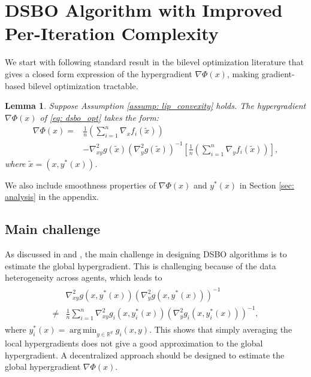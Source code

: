 \documentclass{article}
\theoremstyle{plain}
\newtheorem{lemma}[theorem]{Lemma}
\theoremstyle{definition}
\theoremstyle{remark}
\DeclareMathOperator*{\argmin}{arg\,min}
\newcommand{\R}{\mathbb{R}}
\begin{document}
\section{DSBO Algorithm with Improved Per-Iteration Complexity}\label{sec: algorithms}
We start with following standard result in the bilevel optimization literature \citep{ghadimi2018approximation, hong2020two,ji2020convergence,chen2021closing} that gives a closed form expression of the hypergradient $\nabla\Phi(x)$, making gradient-based bilevel optimization tractable.%
\begin{lemma}
    Suppose Assumption \ref{assump: lip_convexity} holds. The hypergradient $\nabla\Phi(x)$ of \eqref{eq: dsbo_opt} takes the form:
    \begin{equation}\label{eq: hypergrad}
        \begin{aligned}
            \nabla\Phi(x) = &\frac{1}{n}\left(\sum_{i=1}^{n}\nabla_xf_i(\tilde{x})\right) \\
            &- \nabla_{xy}^2g(\tilde{x})\left(\nabla_y^2g(\tilde{x} )\right)^{-1}\left[\frac{1}{n}\left(\sum_{i=1}^{n}\nabla_yf_i(\tilde{x})\right)\right],
        \end{aligned}
    \end{equation}
    where $\tilde{x} = (x, y^*(x))$.
\end{lemma}
We also include smoothness properties of $\nabla \Phi(x)$ and $y^*(x)$ in Section \ref{sec: analysis} in the appendix.

\subsection{Main challenge}

As discussed in \citet{chen2022decentralized} and \citet{yang2022decentralized}, the main challenge in designing DSBO algorithms is to estimate the global hypergradient. This is challenging because of the data heterogeneity across agents, which leads to
\begin{align}\label{neq: mismatch}
    \begin{aligned}
        &\nabla_{xy}^2g(x, y^*(x))\left(\nabla_y^2g(x, y^*(x) )\right)^{-1}\\
        \neq& \frac{1}{n}\sum_{i=1}^{n}\nabla_{xy}^2g_i(x, y_i^*(x))\left(\nabla_y^2g_i(x,y_i^*(x))\right)^{-1},
    \end{aligned}
\end{align}
where $y_i^*(x) =\argmin_{y\in\R^q}g_i(x,y)$. This shows that simply averaging the local hypergradients does not give a good approximation to the global hypergradient. A decentralized approach should be designed to estimate the global hypergradient $\nabla\Phi(x)$. 
\end{document}

